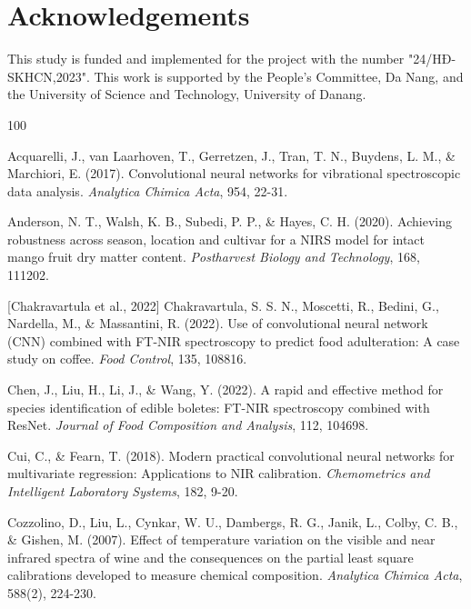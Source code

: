 \documentclass[10pt, a4paper, oneside]{article}
\begin{document}
\section{Acknowledgements}
This study is funded and implemented for the project with the number "24/HĐ-SKHCN,2023". This work is supported by the People’s Committee, Da Nang, and the University of Science and
Technology, University of Danang.

\begin{thebibliography}{100}{
\fontsize{9pt}{10pt}\selectfont
{} Acquarelli, J., van Laarhoven, T., Gerretzen, J., Tran, T. N., Buydens, L. M., \& Marchiori, E. (2017). Convolutional neural networks for vibrational spectroscopic data analysis. \textit{Analytica Chimica Acta}, 954, 22-31.

 Anderson, N. T., Walsh, K. B., Subedi, P. P., \& Hayes, C. H. (2020). Achieving robustness across season, location and cultivar for a NIRS model for intact mango fruit dry matter content. \textit{Postharvest Biology and Technology}, 168, 111202.

 [Chakravartula et al., 2022]
 Chakravartula, S. S. N., Moscetti, R., Bedini, G., Nardella, M., \& Massantini, R. (2022). Use of convolutional neural network (CNN) combined with FT-NIR spectroscopy to predict food adulteration: A case study on coffee. \textit{Food Control}, 135, 108816.

 Chen, J., Liu, H., Li, J., \& Wang, Y. (2022). A rapid and effective method for species identification of edible boletes: FT-NIR spectroscopy combined with ResNet. \textit{Journal of Food Composition and Analysis}, 112, 104698.

 Cui, C., \& Fearn, T. (2018). Modern practical convolutional neural networks for multivariate regression: Applications to NIR calibration. \textit{Chemometrics and Intelligent Laboratory Systems}, 182, 9-20.

 Cozzolino, D., Liu, L., Cynkar, W. U., Dambergs, R. G., Janik, L., Colby, C. B., \& Gishen, M. (2007). Effect of temperature variation on the visible and near infrared spectra of wine and the consequences on the partial least square calibrations developed to measure chemical composition. \textit{Analytica Chimica Acta}, 588(2), 224-230.

}
\end{thebibliography}
\end{document}
